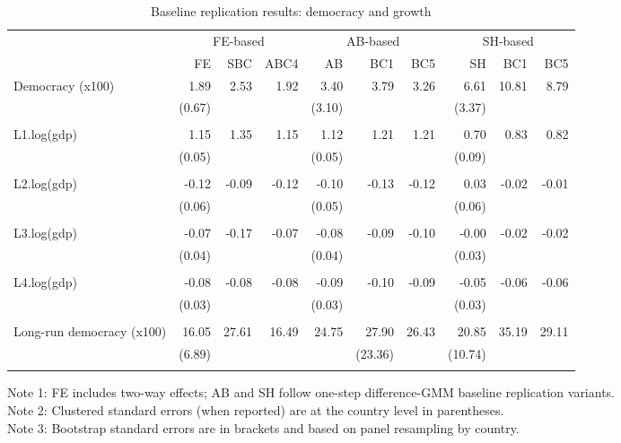 \begin{table}[htbp]
\caption{Baseline replication results: democracy and growth}
\label{tab:democracy-replication-base}
\centering
\begin{tabular}{lrrrrrrrrr}
\toprule
 & \multicolumn{3}{c}{FE-based} & \multicolumn{3}{c}{AB-based} & \multicolumn{3}{c}{SH-based} \\
\cmidrule(lr){2-4} \cmidrule(lr){5-7} \cmidrule(lr){8-10}
 & FE & SBC & ABC4 & AB & BC1 & BC5 & SH & BC1 & BC5 \\
\midrule
Democracy (x100) & 1.89 & 2.53 & 1.92 & 3.40 & 3.79 & 3.26 & 6.61 & 10.81 & 8.79 \\
 & (0.67) &  &  & (3.10) &  &  & (3.37) &  &  \\
 &  &  &  &  &  &  &  &  &  \\
\addlinespace
L1.log(gdp) & 1.15 & 1.35 & 1.15 & 1.12 & 1.21 & 1.21 & 0.70 & 0.83 & 0.82 \\
 & (0.05) &  &  & (0.05) &  &  & (0.09) &  &  \\
 &  &  &  &  &  &  &  &  &  \\
\addlinespace
L2.log(gdp) & -0.12 & -0.09 & -0.12 & -0.10 & -0.13 & -0.12 & 0.03 & -0.02 & -0.01 \\
 & (0.06) &  &  & (0.05) &  &  & (0.06) &  &  \\
 &  &  &  &  &  &  &  &  &  \\
\addlinespace
L3.log(gdp) & -0.07 & -0.17 & -0.07 & -0.08 & -0.09 & -0.10 & -0.00 & -0.02 & -0.02 \\
 & (0.04) &  &  & (0.04) &  &  & (0.03) &  &  \\
 &  &  &  &  &  &  &  &  &  \\
\addlinespace
L4.log(gdp) & -0.08 & -0.08 & -0.08 & -0.09 & -0.10 & -0.09 & -0.05 & -0.06 & -0.06 \\
 & (0.03) &  &  & (0.03) &  &  & (0.03) &  &  \\
 &  &  &  &  &  &  &  &  &  \\
\addlinespace
Long-run democracy (x100) & 16.05 & 27.61 & 16.49 & 24.75 & 27.90 & 26.43 & 20.85 & 35.19 & 29.11 \\
 & (6.89) &  &  &  & (23.36) &  & (10.74) &  &  \\
 &  &  &  &  &  &  &  &  &  \\
\bottomrule
\end{tabular}
\vspace{0.5em}
\begin{flushleft}
\footnotesize
Note 1: FE includes two-way effects; AB and SH follow one-step difference-GMM baseline replication variants.\\
Note 2: Clustered standard errors (when reported) are at the country level in parentheses.\\
Note 3: Bootstrap standard errors are in brackets and based on panel resampling by country.
\end{flushleft}
\end{table}
